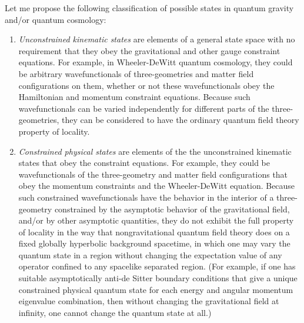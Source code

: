 \documentclass[12pt]{article}
\begin{document}
Let me propose the following classification of possible states in quantum gravity and/or quantum cosmology:

\begin{enumerate}

\item {\it Unconstrained kinematic states} are elements of a general state space with no requirement that they obey the gravitational and other gauge constraint equations.  For example, in Wheeler-DeWitt quantum cosmology, they could be arbitrary wavefunctionals of three-geometries and matter field configurations on them, whether or not these wavefunctionals obey the Hamiltonian and momentum constraint equations.  Because such wavefunctionals can be varied independently for different parts of the three-geometries, they can be considered to have the ordinary quantum field theory property of locality.

\item {\it Constrained physical states} are elements of the the unconstrained kinematic states that obey the constraint equations.  For example, they could be wavefunctionals of the three-geometry and matter field configurations that obey the momentum constraints and the Wheeler-DeWitt equation.  Because such constrained wavefunctionals have the behavior in the interior of a three-geometry constrained by the asymptotic behavior of the gravitational field, and/or by other asymptotic quantities, they do not exhibit the full property of locality in the way that nongravitational quantum field theory does on a fixed globally hyperbolic background spacetime, in which one may vary the quantum state in a region without changing the expectation value of any operator confined to any spacelike separated region.  (For example, if one has suitable asymptotically anti-de Sitter boundary conditions that give a unique constrained physical quantum state for each energy and angular momentum eigenvalue combination, then without changing the gravitational field at infinity, one cannot change the quantum state at all.)


\end{enumerate}
\end{document}
